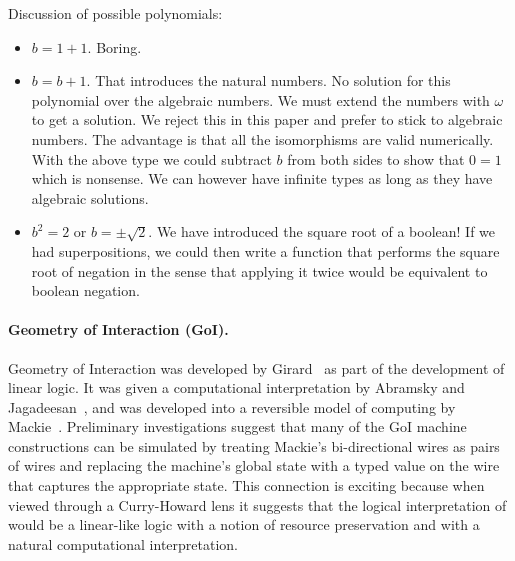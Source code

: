 \documentclass[11pt]{article}
\begin{document}
Discussion of possible polynomials:
\begin{itemize}
\item $b=1+1$. Boring.
\item $b=b+1$. That introduces the natural numbers. No solution for this
  polynomial over the algebraic numbers. We must extend the numbers with
  $\omega$ to get a solution. We reject this in this paper and prefer to
  stick to algebraic numbers. The advantage is that all the isomorphisms are
  valid numerically. With the above type we could subtract $b$ from both
  sides to show that $0=1$ which is nonsense. We can however have infinite
  types as long as they have algebraic solutions.
\item $b^2=2$ or $b = \pm \sqrt{2}$. We have introduced the square root of a
  boolean! If we had superpositions, we could then write a function that
  performs the square root of negation in the sense that applying it twice
  would be equivalent to boolean negation.
\end{itemize}

\paragraph*{Geometry of Interaction (GoI).}
Geometry of Interaction was developed by Girard~\cite{girard1989geometry} as
part of the development of linear logic. It was given a computational
interpretation by Abramsky and
Jagadeesan~\cite{Abramsky:1994:NFG:184662.184664}, and was developed into a
reversible model of computing by
Mackie~\cite{Mackie2011,DBLP:conf/popl/Mackie95}. Preliminary investigations
suggest that many of the GoI machine constructions can be simulated by
treating Mackie's bi-directional wires as pairs of wires and replacing the
machine's global state with a typed value on the wire that captures the
appropriate state. This connection is exciting because when viewed through a
Curry-Howard lens it suggests that the logical interpretation of would be a
linear-like logic with a notion of resource preservation and with a natural
computational interpretation.
\end{document}
